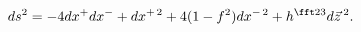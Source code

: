 \begin{equation}
ds^2=-4dx^+dx^-+dx^{+\,2}+4(1-f^2)dx^{-\,2}+h^{\fft23}d\vec z\,^2.
\label{eq:bhb}
\end{equation}

